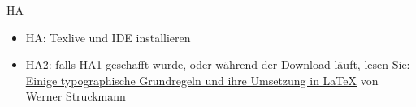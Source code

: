 \begin{frame}{HA}
    
\begin{itemize}
    \item HA: Texlive und IDE installieren
    \item HA2: falls HA1 geschafft wurde, oder während der Download läuft, lesen Sie: \href{http://www2.informatik.hu-berlin.de/sv/lehre/typographie.pdf}{Einige typographische Grundregeln und ihre Umsetzung in \LaTeX} von Werner Struckmann
    \end{itemize}
\end{frame}
